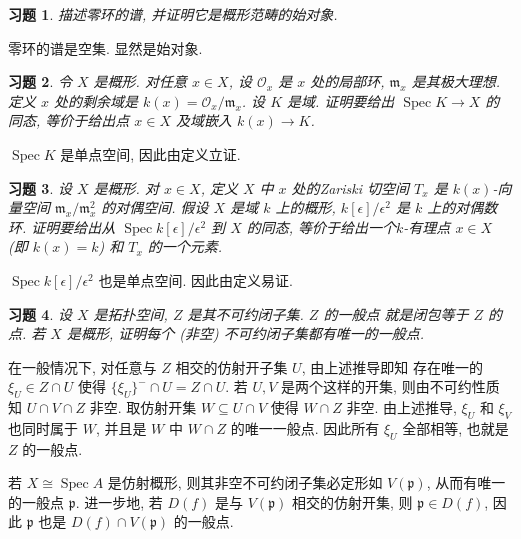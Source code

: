 \documentclass{article}
\theoremstyle{exercise}
\newtheorem{exercise}{习题}[section]
\newenvironment{proofc}{\proof}{\endproof}
\def\gp{\mathfrak{p}}
\def\gm{\mathfrak{m}}
\def\sO{\mathscr{O}}
\def\Spec{\operatorname{Spec}}
\begin{document}
\begin{exercise}
  描述零环的谱, 并证明它是概形范畴的始对象.
\end{exercise}

\begin{proofc}
  零环的谱是空集. 显然是始对象.
\end{proofc}

\begin{exercise}
  令 $X$ 是概形. 对任意 $x \in X$, 设 $\sO_x$ 是 $x$ 处的局部环,
  $\gm_x$ 是其极大理想. 定义 $x$ 处的\emph{剩余域}是 $k(x) = \sO_x / \gm_x$.
  设 $K$ 是域. 证明要给出 $\Spec K \to X$ 的同态, 等价于给出点 $x \in X$
  及域嵌入 $k(x) \to K$.
\end{exercise}

\begin{proofc}
  $\Spec K$ 是单点空间, 因此由定义立证.
\end{proofc}

\begin{exercise}
  设 $X$ 是概形. 对 $x \in X$, 定义 $X$ 中 $x$ 处的\emph{Zariski 切空间} $T_x$
  是 $k(x)$-向量空间 $\gm_x / \gm_x^2$ 的对偶空间.
  假设 $X$ 是域 $k$ 上的概形, $k[\epsilon] / \epsilon^2$ 是 $k$ 上的\emph{对偶数环}.
  证明要给出从 $\Spec k[\epsilon]/\epsilon^2$ 到 $X$ 的同态,
  等价于给出一个\emph{$k$-有理点} $x \in X$ (即 $k(x) = k$) 和 $T_x$ 的一个元素.
\end{exercise}

\begin{proofc}
  $\Spec k[\epsilon] / \epsilon^2$ 也是单点空间. 因此由定义易证.
\end{proofc}

\begin{exercise}
  设 $X$ 是拓扑空间, $Z$ 是其不可约闭子集. $Z$ 的\emph{一般点} 就是闭包等于 $Z$ 的点.
  若 $X$ 是概形, 证明每个 (非空) 不可约闭子集都有唯一的一般点.
\end{exercise}

\begin{proofc}
  在一般情况下, 对任意与 $Z$ 相交的仿射开子集 $U$, 由上述推导即知
  存在唯一的 $\xi_U \in Z \cap U$ 使得 $\{ \xi_U \}^- \cap U = Z \cap U$.
  若 $U, V$ 是两个这样的开集, 则由不可约性质知 $U \cap V \cap Z$ 非空.
  取仿射开集 $W \subseteq U \cap V$ 使得 $W \cap Z$ 非空.
  由上述推导, $\xi_U$ 和 $\xi_V$ 也同时属于 $W$, 并且是 $W$ 中 $W \cap Z$ 的唯一一般点.
  因此所有 $\xi_U$ 全部相等, 也就是 $Z$ 的一般点.

  若 $X \cong \Spec A$ 是仿射概形, 则其非空不可约闭子集必定形如 $V(\gp)$,
  从而有唯一的一般点 $\gp$.
  进一步地, 若 $D(f)$ 是与 $V(\gp)$ 相交的仿射开集, 则 $\gp \in D(f)$,
  因此 $\gp$ 也是 $D(f) \cap V(\gp)$ 的一般点.
\end{proofc}
\end{document}
